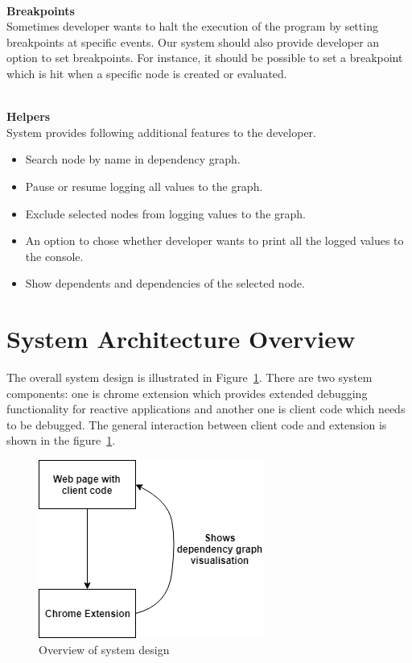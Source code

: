 \leavevmode
\\
\textbf{Breakpoints}
\\
Sometimes developer wants to halt the execution of the program by setting breakpoints at specific events. Our system should also provide developer an option to set breakpoints. For instance, it should be possible to set a breakpoint which is hit when a specific node is created or evaluated. 

\leavevmode
\\
\textbf{Helpers}
\\
System provides following additional features to the developer.

\begin{itemize}
	\item Search node by name in dependency graph.
	\item Pause or resume logging all values to the graph.
	\item Exclude selected nodes from logging values to the graph.
	\item An option to chose whether developer wants to print all the logged values to the console.
	\item Show dependents and dependencies of the selected node.
\end{itemize}

\section{System Architecture Overview}
The overall system design is illustrated in Figure~\ref{fig:system-design}. There are two system components: one is chrome extension which provides extended debugging functionality for reactive applications and another one is client code which needs to be debugged. The general interaction between client code and extension is shown in the figure~\ref{fig:system-design}. 

\begin{figure}[!h]
	\centering
	\includegraphics[scale=0.6,trim=0 0 0 0]{images/system-design.png}
	\caption{Overview of system design}
	\label{fig:system-design}
\end{figure}

